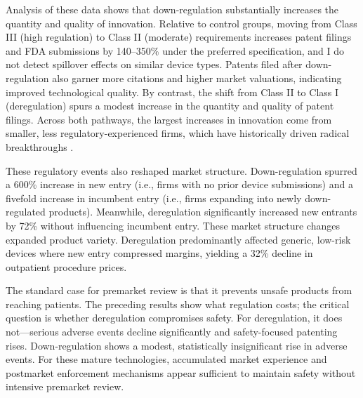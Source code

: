\documentclass[letterpaper,12pt]{article}
\theoremstyle{definition}
\begin{document}
Analysis of these data shows that down-regulation substantially increases the quantity and quality of innovation. Relative to control groups, moving from Class III (high regulation) to Class II (moderate) requirements increases patent filings and FDA submissions by 140--350\% under the preferred specification, and I do not detect spillover effects on similar device types.\footnotemark {}  Patents filed after down-regulation also garner more citations and higher market valuations, indicating improved technological quality. By contrast, the shift from Class II to Class I (deregulation) spurs a modest increase in the quantity and quality of patent filings. Across both pathways, the largest increases in innovation come from smaller, less regulatory-experienced firms, which have historically driven radical breakthroughs \citep{wu2019large}.

These regulatory events also reshaped market structure. Down-regulation spurred a 600\% increase in new entry (i.e., firms with no prior device submissions) and a fivefold increase in incumbent entry (i.e., firms expanding into newly down-regulated products). Meanwhile, deregulation significantly increased new entrants by 72\% without influencing incumbent entry. These market structure changes expanded product variety. Deregulation predominantly affected generic, low-risk devices where new entry compressed margins, yielding a 32\% decline in outpatient procedure prices.


The standard case for premarket review is that it prevents unsafe products from reaching patients. The preceding results show what regulation costs; the critical question is whether deregulation compromises safety. For deregulation, it does not---serious adverse events decline significantly and safety-focused patenting rises.\footnotemark {} Down-regulation shows a modest, statistically insignificant rise in adverse events. For these mature technologies, accumulated market experience and postmarket enforcement mechanisms appear sufficient to maintain safety without intensive premarket review.
\end{document}
